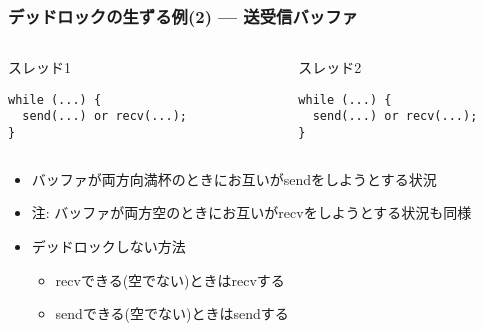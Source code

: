 \documentclass[12pt,dvipdfmx]{beamer}
\begin{document}
\begin{frame}[fragile]
  \frametitle{デッドロックの生ずる例(2) --- 送受信バッファ}
  \begin{columns}
    \begin{column}{0.4\textwidth}
スレッド1
\begin{lstlisting}
while (...) {
  send(...) or recv(...);
}    
\end{lstlisting}
    \end{column}
    \begin{column}{0.0\textwidth}
    \end{column}
    \begin{column}{0.4\textwidth}
スレッド2
\begin{lstlisting}
while (...) {
  send(...) or recv(...);
}    
\end{lstlisting}
    \end{column}
  \end{columns}

\begin{center}
%
%
%
%
%
\end{center}

\begin{itemize}
\item バッファが両方向満杯のときにお互いがsendをしようとする状況
\item 注: バッファが両方空のときにお互いがrecvをしようとする状況も同様
\item デッドロックしない方法
  \begin{itemize}
  \item recvできる(空でない)ときはrecvする
  \item sendできる(空でない)ときはsendする
  \end{itemize}
\end{itemize}

\end{frame}
\end{document}
